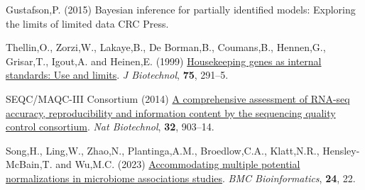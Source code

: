\documentclass[
]{article}
\newlength{\cslhangindent}
\newenvironment{CSLReferences}[2] %
 {\begin{list}{}{%
  \setlength{\itemindent}{0pt}
  \setlength{\leftmargin}{0pt}
  \setlength{\parsep}{0pt}
  \ifodd #1
   \setlength{\leftmargin}{\cslhangindent}
   \setlength{\itemindent}{-1\cslhangindent}
  \fi
  \setlength{\itemsep}{#2\baselineskip}}}
 {\end{list}}
\providecommand{\DIFadd}[1]{{\protect\color{blue}\uwave{#1}}} %
\providecommand{\DIFaddbegin}{} %
\providecommand{\DIFaddend}{} %
\newcommand{\DIFaddincludegraphics}[2][]{{\color{blue}\fbox{\DIFOincludegraphics[#1]{#2}}}} %
\DeclareRobustCommand{\DIFaddbegin}{\DIFOaddbegin \let\includegraphics\DIFaddincludegraphics} %
\DeclareRobustCommand{\DIFaddend}{\DIFOaddend \let\includegraphics\DIFOincludegraphics} %
\begin{document}
\begin{CSLReferences}{1}{1}
 \DIFaddbegin \DIFadd{72. }\DIFaddend Gustafson,P. (2015) Bayesian inference for partially identified
models: Exploring the limits of limited data CRC Press.

 \DIFaddbegin \DIFadd{73. }\DIFaddend Thellin,O., Zorzi,W., Lakaye,B., De Borman,B., Coumans,B.,
Hennen,G., Grisar,T., Igout,A. and Heinen,E. (1999)
\href{https://www.ncbi.nlm.nih.gov/pubmed/10617337}{Housekeeping genes
as internal standards: Use and limits}. \emph{J Biotechnol},
\textbf{75}, 291--5.

 \DIFaddbegin \DIFadd{74. }\DIFaddend SEQC/MAQC-III Consortium (2014)
\href{https://doi.org/10.1038/nbt.2957}{A comprehensive assessment of
RNA-seq accuracy, reproducibility and information content by the
sequencing quality control consortium}. \emph{Nat Biotechnol},
\textbf{32}, 903--14.

 \DIFaddbegin \DIFadd{75. }\DIFaddend Song,H., Ling,W., Zhao,N., Plantinga,A.M., Broedlow,C.A.,
Klatt,N.R., Hensley-McBain,T. and Wu,M.C. (2023)
\href{https://doi.org/10.1186/s12859-023-05147-w}{Accommodating multiple
potential normalizations in microbiome associations studies}. \emph{BMC
Bioinformatics}, \textbf{24}, 22.

\end{CSLReferences}
\end{document}
